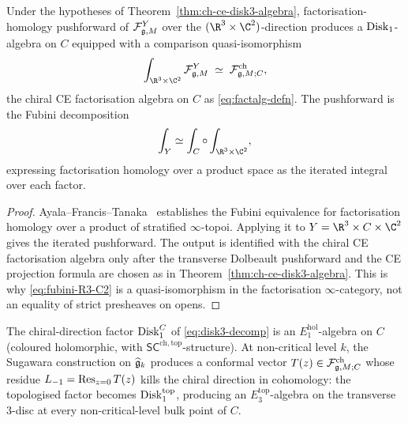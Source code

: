\begin{theorem}
\label{thm:ch-ce-fubini-disk3-to-disk1}
%
Under the hypotheses of Theorem~\ref{thm:ch-ce-disk3-algebra},
factorisation-homology pushforward of $\mathcal{F}^Y_{\mathfrak{g},M}$ over the
$(\R^3\times\C^2)$-direction produces a $\mathrm{Disk}_1$-algebra on $C$
equipped with a comparison quasi-isomorphism
\begin{equation}
\label{eq:fubini-R3-C2}
\int_{\R^3\times\C^2}\cF^Y_{\fg,M}
\;\simeq\;
\cF^{\mathrm{ch}}_{\fg,M;C},
\end{equation}
the chiral CE factorisation algebra on $C$ as
\eqref{eq:factalg-defn}. The pushforward is the Fubini decomposition
\begin{equation}
\int_Y \simeq \int_C \circ \int_{\R^3\times\C^2},
\end{equation}
expressing factorisation homology over a product space as the iterated
integral over each factor.
\end{theorem}

\begin{proof}
Ayala--Francis--Tanaka~\cite[Thm.\,4.1.3]{AyalaFrancisTanaka2017}
establishes the Fubini equivalence for factorisation homology over a
product of stratified $\infty$-topoi. Applying it to
$Y=\R^3\times C\times\C^2$ gives the iterated pushforward. The output is
identified with the chiral CE factorisation algebra only after the
transverse Dolbeault pushforward and the CE projection formula are
chosen as in Theorem~\ref{thm:ch-ce-disk3-algebra}. This is why
\eqref{eq:fubini-R3-C2} is a quasi-isomorphism in the factorisation
$\infty$-category, not an equality of strict presheaves on opens.
\end{proof}

\begin{theorem}
\label{thm:ch-ce-topologization-E3-top}
%
The chiral-direction factor $\mathrm{Disk}_1^C$ of \eqref{eq:disk3-decomp} is
an $E_1^{\mathrm{hol}}$-algebra on $C$ (coloured holomorphic, with
$\mathsf{SC}^{\mathrm{ch,top}}$-structure). At non-critical level $k$,
the Sugawara construction on $\widehat{\mathfrak{g}}_k$ produces a conformal
vector $T(z)\in\mathcal{F}^{\mathrm{ch}}_{\mathfrak{g},M;C}$ whose residue
$L_{-1} = \operatorname{Res}_{z=0}T(z)$ kills the chiral direction in cohomology:
the topologised factor becomes $\mathrm{Disk}_1^{\mathrm{top}}$, producing an
$E_3^{\mathrm{top}}$-algebra on the transverse $3$-disc at every
non-critical-level bulk point of $C$.
\end{theorem}

